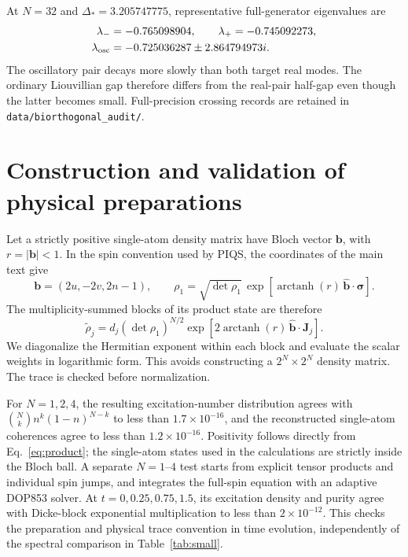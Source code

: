 \documentclass[aps,pra,10pt,onecolumn,superscriptaddress,amsmath,amssymb]{revtex4-2}
\begin{document}
At $N=32$ and $\Delta_*=3.205747775$, representative full-generator eigenvalues are
\begin{align}
 \lambda_-&=-0.765098904,\qquad \lambda_+=-0.745092273,\\
 \lambda_{\rm osc}&=-0.725036287\pm2.864794973i.
\end{align}
The oscillatory pair decays more slowly than both target real modes. The ordinary Liouvillian gap therefore differs from the real-pair half-gap even though the latter becomes small. Full-precision crossing records are retained in \texttt{data/biorthogonal\_audit/}.

\section{Construction and validation of physical preparations}
Let a strictly positive single-atom density matrix have Bloch vector $\bm b$, with $r=|\bm b|<1$. In the spin convention used by PIQS, the coordinates of the main text give
\begin{equation}
 \bm b=(2u,-2v,2n-1),\qquad
 \rho_1=\sqrt{\det\rho_1}\,\exp[\operatorname{arctanh}(r)\,\widehat{\bm b}\cdot\bm\sigma].
\end{equation}
The multiplicity-summed blocks of its product state are therefore
\begin{equation}
 \widetilde\rho_j=d_j(\det\rho_1)^{N/2}
       \exp[2\operatorname{arctanh}(r)\,\widehat{\bm b}\cdot\bm J_j].
 \label{eq:product}
\end{equation}
We diagonalize the Hermitian exponent within each block and evaluate the scalar weights in logarithmic form. This avoids constructing a $2^N\times2^N$ density matrix. The trace is checked before normalization.

For $N=1,2,4$, the resulting excitation-number distribution agrees with $\binom Nk n^k(1-n)^{N-k}$ to less than $1.7\times10^{-16}$, and the reconstructed single-atom coherences agree to less than $1.2\times10^{-16}$. Positivity follows directly from Eq.~\eqref{eq:product}; the single-atom states used in the calculations are strictly inside the Bloch ball. A separate $N=1$--$4$ test starts from explicit tensor products and individual spin jumps, and integrates the full-spin equation with an adaptive DOP853 solver. At $t=0,0.25,0.75,1.5$, its excitation density and purity agree with Dicke-block exponential multiplication to less than $2\times10^{-12}$. This checks the preparation and physical trace convention in time evolution, independently of the spectral comparison in Table~\ref{tab:small}.
\end{document}
